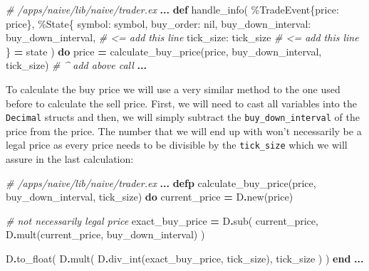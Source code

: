 \documentclass[
]{book}
\newenvironment{Shaded}{\begin{snugshade}}{\end{snugshade}}
\newcommand{\CommentTok}[1]{\textcolor[rgb]{0.56,0.35,0.01}{\textit{#1}}}
\newcommand{\ConstantTok}[1]{\textcolor[rgb]{0.00,0.00,0.00}{#1}}
\newcommand{\KeywordTok}[1]{\textcolor[rgb]{0.13,0.29,0.53}{\textbf{#1}}}
\newcommand{\NormalTok}[1]{#1}
\newcommand{\OperatorTok}[1]{\textcolor[rgb]{0.81,0.36,0.00}{\textbf{#1}}}
\newcommand{\VariableTok}[1]{\textcolor[rgb]{0.00,0.00,0.00}{#1}}
\begin{document}
\begin{Shaded}
\begin{Highlighting}[]
  \CommentTok{\# /apps/naive/lib/naive/trader.ex}
  \OperatorTok{...}
  \KeywordTok{def}\NormalTok{ handle\_info(}
\NormalTok{        \%}\ConstantTok{TradeEvent}\NormalTok{\{}\VariableTok{price:}\NormalTok{ price\},}
\NormalTok{        \%}\ConstantTok{State}\NormalTok{\{}
          \VariableTok{symbol:}\NormalTok{ symbol,}
          \VariableTok{buy\_order:} \ConstantTok{nil}\NormalTok{,}
          \VariableTok{buy\_down\_interval:}\NormalTok{ buy\_down\_interval, }\CommentTok{\# \textless{}= add this line}
          \VariableTok{tick\_size:}\NormalTok{ tick\_size                  }\CommentTok{\# \textless{}= add this line          }
\NormalTok{        \} }\OperatorTok{=}\NormalTok{ state}
\NormalTok{      ) }\KeywordTok{do}
\NormalTok{    price }\OperatorTok{=}\NormalTok{ calculate\_buy\_price(price, buy\_down\_interval, tick\_size)}
    \CommentTok{\# \^{} add above call}
    \OperatorTok{...}
\end{Highlighting}
\end{Shaded}

To calculate the buy price we will use a very similar method to the one used
before to calculate the sell price. First, we will need to cast all variables
into the \texttt{Decimal} structs and then, we will simply subtract the \texttt{buy\_down\_interval} of the price from the price. The number that we will end up with won't necessarily be a legal price as every price needs to be divisible by the \texttt{tick\_size} which we will assure in the last calculation:

\begin{Shaded}
\begin{Highlighting}[]
  \CommentTok{\# /apps/naive/lib/naive/trader.ex}
  \OperatorTok{...}
  \KeywordTok{defp}\NormalTok{ calculate\_buy\_price(price, buy\_down\_interval, tick\_size) }\KeywordTok{do}
\NormalTok{    current\_price }\OperatorTok{=}\NormalTok{ D}\OperatorTok{.}\NormalTok{new(price)}

    \CommentTok{\# not necessarily legal price}
\NormalTok{    exact\_buy\_price }\OperatorTok{=}
\NormalTok{      D}\OperatorTok{.}\NormalTok{sub(}
\NormalTok{        current\_price,}
\NormalTok{        D}\OperatorTok{.}\NormalTok{mult(current\_price, buy\_down\_interval)}
\NormalTok{      )}

\NormalTok{    D}\OperatorTok{.}\NormalTok{to\_float(}
\NormalTok{      D}\OperatorTok{.}\NormalTok{mult(}
\NormalTok{        D}\OperatorTok{.}\NormalTok{div\_int(exact\_buy\_price, tick\_size),}
\NormalTok{        tick\_size}
\NormalTok{      )}
\NormalTok{    )}
  \KeywordTok{end}
  \OperatorTok{...}
\end{Highlighting}
\end{Shaded}
\end{document}
